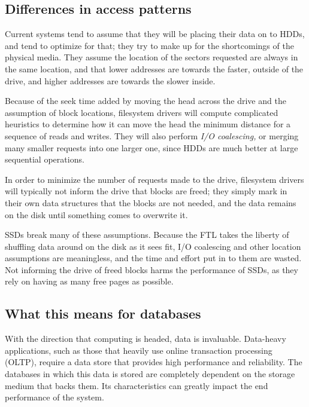 \documentclass[format=acmsmall, review=false, screen=true]{acmart}
\begin{document}
\subsection{Differences in access patterns}

Current systems tend to assume that they will be placing their data on to HDDs, and tend to optimize for that; they try 
to make up for the shortcomings of the physical media. They assume the location of the sectors requested are always in 
the same location, and that lower addresses are towards the faster, outside of the drive, and higher addresses are towards 
the slower inside. \cite{Cornwell2012}

Because of the seek time added by moving the head across the drive and the assumption of block locations, filesystem drivers 
will compute complicated heuristics to determine how it can move the head the minimum distance for a sequence of reads 
and writes. They will also perform \textit{I/O coalescing,} or merging many smaller requests into one larger one, since 
HDDs are much better at large sequential operations. \cite{Cornwell2012}

In order to minimize the number of requests made to the drive, filesystem drivers will typically not inform the drive that 
blocks are freed; they simply mark in their own data structures that the blocks are not needed, and the data remains on 
the disk until something comes to overwrite it. \cite{Cornwell2012}

SSDs break many of these assumptions. Because the FTL takes the liberty of shuffling data around on the disk as it sees 
fit, I/O coalescing and other location assumptions are meaningless, and the time and effort put in to them are wasted. 
Not informing the drive of freed blocks harms the performance of SSDs, as they rely on having as many free pages as 
possible. \cite{Cornwell2012, Micheloni2013, MatejFucek2014}

\subsection{What this means for databases}

With the direction that computing is headed, data is invaluable. Data-heavy applications, such as those that heavily use 
online transaction processing (OLTP), require a data store that provides high performance and reliability.  The databases 
in which this data is stored are completely dependent on the storage medium that backs them. Its characteristics can 
greatly impact the end performance of the system. \cite{Lee2009, Xie2011, Micheloni2013, MatejFucek2014, Chen2016}
\end{document}
